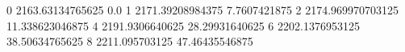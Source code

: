 0 2163.63134765625 0.0
1 2171.39208984375 7.7607421875
2 2174.969970703125 11.338623046875
4 2191.9306640625 28.29931640625
6 2202.1376953125 38.50634765625
8 2211.095703125 47.46435546875
